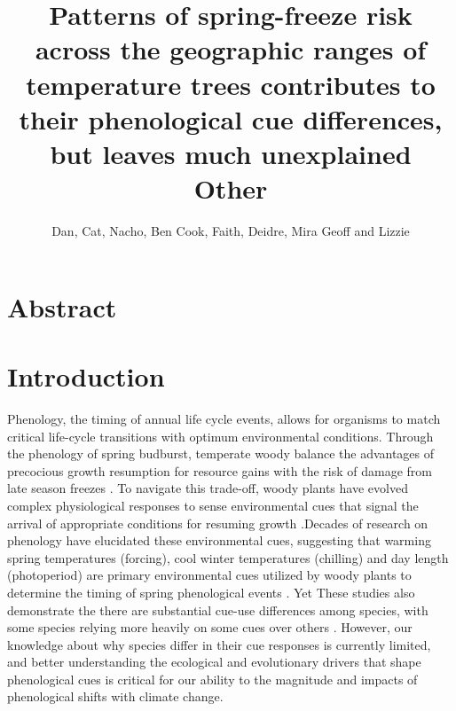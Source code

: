 \documentclass[12pt]{article}
\title{
Patterns of spring-freeze risk across the geographic ranges of temperature trees contributes to their phenological cue differences, but leaves much unexplained\\
Other
}
\author{Dan, Cat, Nacho, Ben Cook, Faith, Deidre, Mira Geoff and Lizzie}
\begin{document}

\maketitle

\section*{Abstract}
\section*{Introduction}


Phenology, the timing of annual life cycle events, allows for organisms to match critical life-cycle transitions with optimum environmental conditions. Through the phenology of spring budburst, temperate woody balance the advantages of precocious growth resumption for resource gains with the risk of damage from late season freezes \citep{Savage:2013aa}. To navigate this trade-off, woody plants have evolved complex physiological responses to sense environmental cues that signal the arrival of appropriate conditions for resuming growth \citep{}.Decades of research on phenology have elucidated these environmental cues, suggesting that warming spring temperatures (forcing), cool winter temperatures (chilling) and day length (photoperiod) are primary environmental cues utilized by woody plants to determine the timing of spring phenological events \citep{Ettinger:2020aa,Forrest2010}. Yet These studies also demonstrate the there are substantial cue-use differences among species, with some species relying more heavily on some cues over others \citep{Laube:2014aa}. However, our knowledge about why species differ in their cue responses is currently limited, and better understanding the ecological and evolutionary drivers that shape phenological cues is critical for our ability to the magnitude and impacts of phenological shifts with climate change.
\end{document}
